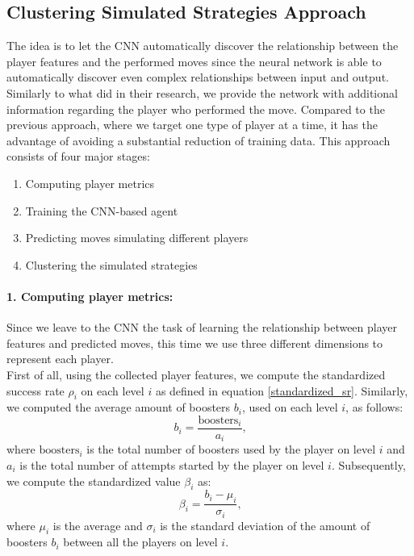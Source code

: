 \subsection{Clustering Simulated Strategies Approach}
The idea is to let the \acs{CNN} automatically discover the relationship between the player features and the performed moves since the neural network is able to automatically discover even complex relationships between input and output. Similarly to what \textcite{maddison_move_2014} did in their research, we provide the network with additional information regarding the player who performed the move. Compared to the previous approach, where we target one type of player at a time, it has the advantage of avoiding a substantial reduction of training data.
This approach consists of four major stages:

\begin{enumerate}
    \item Computing player metrics
    \item Training the \acs{CNN}-based agent
    \item Predicting moves simulating different players
    \item Clustering the simulated strategies
\end{enumerate}

\paragraph{1. Computing player metrics:}
Since we leave to the \acs{CNN} the task of learning the relationship between player features and predicted moves, this time we use three different dimensions to represent each player. \\
First of all, using the collected player features, we compute the standardized success rate $\rho_{i}$ on each level $i$ as defined in equation \ref{standardized_sr}. Similarly, we computed the average amount of boosters $b_i$, used on each level $i$, as follows:
\begin{equation}
      b_i  = \frac{\text{boosters}_i}{a_i} \text{,}
\end{equation}
where $\text{boosters}_i$ is the total number of boosters used by the player on level $i$ and $a_i$ is the total number of attempts started by the player on level $i$. Subsequently, we compute the standardized value $\beta_i$ as:
\begin{equation}
       \beta_i  = \frac{b_i - \mu_i }{\sigma_i} \text{,}
\end{equation}
where $\mu_i$ is the average and $\sigma_i$ is the standard deviation of the amount of boosters $b_i$ between all the players on level $i$.


